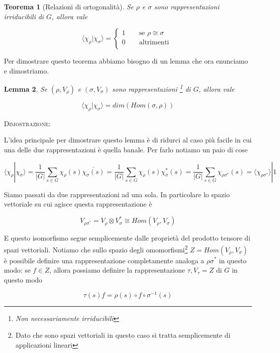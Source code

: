 \documentclass[11pt]{article}
\theoremstyle{plain}
\newtheorem{thm}{Teorema}[section]
\newtheorem{lemma}[thm]{Lemma}
\theoremstyle{definition}
\theoremstyle{remark}
\newcommand{\dsum}{\displaystyle\sum}
\begin{document}
\begin{thm}[Relazioni di ortogonalità]
Se $\rho$ e $\sigma$ sono rappresentazioni irriducibili di $G$, allora vale

\[\langle \chi_{\rho}|\chi_{\sigma} \rangle = \begin{cases}
1 \qquad \text{se } \rho \cong \sigma \\
0 \qquad \text{altrimenti }\\
\end{cases} \]
\label{relazione di ortogonalita}
\end{thm}

Per dimostrare questo teorema abbiamo bisogno di un lemma che ora enunciamo e dimostriamo.




\begin{lemma}
Se $(\rho, V_\rho)$ e $(\sigma, V_\sigma)$ sono rappresentazioni \footnote{Non necessariamente irriducibili} di $G$, allora vale

\[ \langle \chi_\rho | \chi_\sigma \rangle  = dim(Hom (\sigma, \rho))\] 

\end{lemma}
\textsc{Dimostrazione:}

L'idea principale per dimostrare questo lemma è di ridurci al caso più facile in cui una delle due rappresentazioni è quella banale. Per farlo notiamo un paio di cose

\[ \langle \chi_\rho | \chi_\sigma \rangle = \dfrac{1}{|G|} \dsum_{s\in G} \chi_\rho(s)\overline{ \chi_\sigma(s)} = \dfrac{1}{|G|} \dsum_{s\in G} {\chi_{\rho}(s)} \chi_\sigma^*(s) = \dfrac{1}{|G|} \dsum_{s\in G} \chi_{\rho\sigma^*}(s)  = \langle \chi_{\rho\sigma^*} \rangle | 1\]

Siamo passati da due rappresentazioni ad una sola. In particolare lo spazio vettoriale su cui agisce questa rappresentazione è 

\[ V_{\rho \sigma^*} = V_{\rho} \otimes V_\sigma^* \cong Hom(V_\rho, V_\sigma)\]

E questo isomorfismo segue semplicemente dalle proprietà del prodotto tensore di spazi vettoriali. Notiamo che sullo spazio degli omomorfismi\footnote{Dato che sono spazi vettoriali in questo caso si tratta semplicemente di applicazioni lineari} $Z = Hom(V_\rho, V_\sigma)$ è possibile definire una rappresentazione completamente analoga a $\rho\sigma^*$ in questo modo: se $f \in Z$, allora possiamo definire la rappresentazione $\tau, V_\tau = Z$ di $G$ in questo modo

\[ \tau(s)f = \rho(s) \circ f \circ \sigma^{-1}(s)\]
\end{document}
